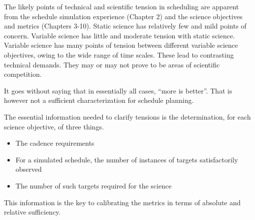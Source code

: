 The likely points of technical and scientific tension in scheduling are apparent from the schedule simulation experience (Chapter 2) and the science objectives and metrics (Chapters 3-10).  Static science has relatively few and mild points of concern.  Variable science has little and moderate tension with static science.  Variable science has many points of tension between different variable science objectives, owing to the wide range of time scales. These lead to contrasting technical demands.  They may or may not prove to be areas of scientific competition. 

It goes without saying that in essentially all cases, ``more is better''.  That is however not a sufficient characterization for schedule planning.

The essential information needed to clarify tensions is the determination, for each science objective, of three things.
\begin{itemize}
	\item The cadence requirements
	\item For a simulated schedule, the number of instances of targets satisfactorily observed
	\item The number of such targets required for the science
\end{itemize}
	
This information is the key to calibrating the metrics in terms of absolute and relative  sufficiency. 
